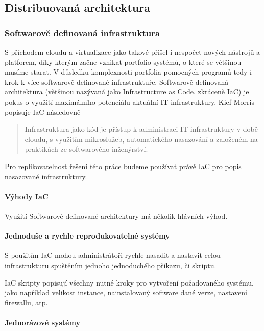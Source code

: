 \documentclass[thesis=M,czech]{FITthesis}[2019/12/23]
\theoremstyle{plain}
\theoremstyle{definition}
\begin{document}
\subsection{Distribuovaná architektura}


\subsubsection{Softwarově definovaná infrastruktura}

S příchodem cloudu a virtualizace jako takové přišel i nespočet nových nástrojů a platforem, díky kterým začne vznikat portfolio systémů, o které se většinou musíme starat. V důsledku komplexnosti portfolia pomocných programů tedy i krok k více softwarově definované infrastruktuře. Softwarově definovaná architektura (většinou nazývaná jako Infrastructure as Code, zkráceně IaC) je pokus o využití maximálního potenciálu aktuální IT infrastruktury. Kief Morris \cite{kief-morris-iac} popisuje IaC následovně


\begin{quotation}
Infrastruktura jako kód je přístup k administraci IT infrastruktury v době cloudu, s využitím mikroslužeb, automatického nasazování a založeném na praktikách ze softwarového inženýrství.  
\end{quotation}

Pro replikovatelnost řešení této práce budeme používat právě IaC pro popis nasazované infrastruktury.

\paragraph{Výhody IaC}

Využití Softwarově definované architektury má několik hlávních výhod.

\paragraph{Jednoduše a rychle reprodukovatelné systémy}

S použitím IaC mohou administrátoři rychle nasadit a nastavit celou infrastrukturu spuštěním jednoho jednoduchého příkazu, či skriptu.

IaC skripty popisují všechny nutné kroky pro vytvoření požadovaného systému, jako například velikost instance, nainstalovaný software dané verze, nastavení firewallu, atp.

\paragraph{Jednorázové systémy}
\end{document}

